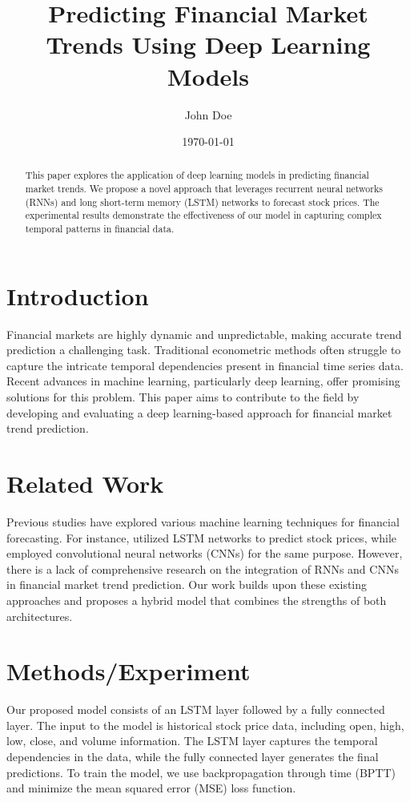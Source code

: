 \documentclass{article}
\title{Predicting Financial Market Trends Using Deep Learning Models}
\author{John Doe}
\date{\today}
\begin{document}
\maketitle

\begin{abstract}
This paper explores the application of deep learning models in predicting financial market trends. We propose a novel approach that leverages recurrent neural networks (RNNs) and long short-term memory (LSTM) networks to forecast stock prices. The experimental results demonstrate the effectiveness of our model in capturing complex temporal patterns in financial data.
\end{abstract}

\section{Introduction}
Financial markets are highly dynamic and unpredictable, making accurate trend prediction a challenging task. Traditional econometric methods often struggle to capture the intricate temporal dependencies present in financial time series data. Recent advances in machine learning, particularly deep learning, offer promising solutions for this problem. This paper aims to contribute to the field by developing and evaluating a deep learning-based approach for financial market trend prediction.

\section{Related Work}
Previous studies have explored various machine learning techniques for financial forecasting. For instance, \cite{choi2017deep} utilized LSTM networks to predict stock prices, while \cite{zhang2018stock} employed convolutional neural networks (CNNs) for the same purpose. However, there is a lack of comprehensive research on the integration of RNNs and CNNs in financial market trend prediction. Our work builds upon these existing approaches and proposes a hybrid model that combines the strengths of both architectures.

\section{Methods/Experiment}
Our proposed model consists of an LSTM layer followed by a fully connected layer. The input to the model is historical stock price data, including open, high, low, close, and volume information. The LSTM layer captures the temporal dependencies in the data, while the fully connected layer generates the final predictions. To train the model, we use backpropagation through time (BPTT) and minimize the mean squared error (MSE) loss function.
\end{document}
